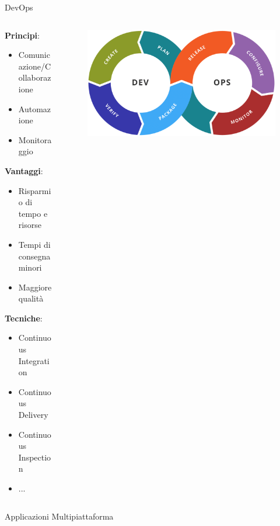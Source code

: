 \begin{frame}{DevOps}
    \begin{columns}[onlytextwidth]
        \begin{column}{0.45\textwidth}
            \textbf{Principi}:
            \begin{itemize}
                \item Comunicazione/Collaborazione
                \item Automazione
                \item Monitoraggio
            \end{itemize}
            \vspace{3mm}
            \textbf{Vantaggi}:
            \begin{itemize}
                \item Risparmio di tempo e risorse
                \item Tempi di consegna minori
                \item Maggiore qualità
            \end{itemize}
            \vspace{3mm}
            \textbf{Tecniche}:
            \begin{itemize}
                \item Continuous Integration
                \item Continuous Delivery
                \item Continuous Inspection
                \item ...
            \end{itemize}
        \end{column}
        \begin{column}{0.55\textwidth}
             \begin{figure}[H]
                \includegraphics[width=1\textwidth]{img/Devops-toolchain.png}
            \end{figure}
        \end{column}
    \end{columns}
\end{frame}

\begin{frame}{Applicazioni Multipiattaforma}
    
\end{frame}